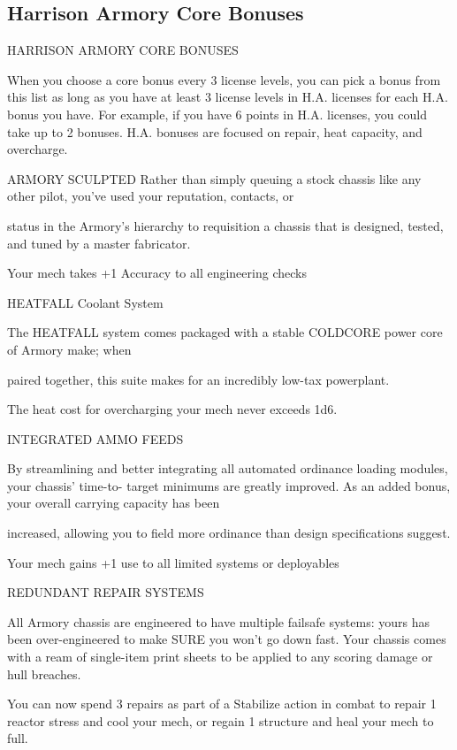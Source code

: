 \subsection{Harrison Armory Core Bonuses}

                           HARRISON ARMORY CORE BONUSES  

When you choose a core bonus every 3 license levels, you can pick a bonus from this list as long  
as you have at least 3 license levels in H.A. licenses for each H.A. bonus you have. For example,  
if you have 6 points in H.A. licenses, you could take up to 2 bonuses. H.A. bonuses are focused  
on repair, heat capacity, and overcharge.
 

ARMORY SCULPTED  
Rather than simply queuing a stock chassis like any other pilot, you’ve used your reputation, contacts, or  

status in the Armory’s hierarchy to requisition a chassis that is designed, tested, and tuned by a master  
fabricator.    

Your mech takes +1 Accuracy to all engineering checks
 

HEATFALL Coolant System  

The HEATFALL system comes packaged with a stable COLDCORE power core of Armory make; when  

paired together, this suite makes for an incredibly low-tax powerplant.   

The heat cost for overcharging your mech never exceeds 1d6.
 

INTEGRATED AMMO FEEDS  

By streamlining and better integrating all automated ordinance loading modules, your chassis’ time-to- 
target minimums are greatly improved. As an added bonus, your overall carrying capacity has been  

increased, allowing you to field more ordinance than design specifications suggest.    

Your mech gains +1 use to all limited systems or deployables
 

REDUNDANT REPAIR SYSTEMS  

All Armory chassis are engineered to have multiple failsafe systems: yours has been over-engineered to  
make SURE you won’t go down fast. Your chassis comes with a ream of single-item print sheets to be  
applied to any scoring damage or hull breaches.    

You can now spend 3 repairs as part of a Stabilize action in combat to repair 1 reactor stress and  
cool your mech, or regain 1 structure and heal your mech to full.
 

